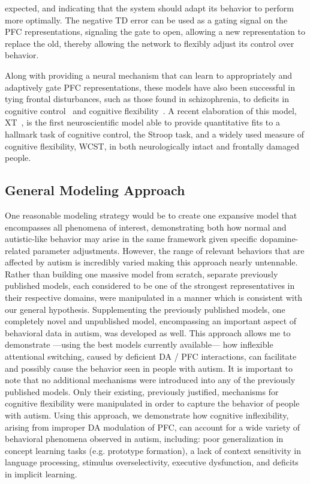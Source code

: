 \documentclass[man]{apa}
\begin{document}
expected, and indicating that the system should adapt its behavior to perform more optimally.  The negative TD error can be used as a gating signal on the PFC representations, signaling the gate to open, allowing a new representation to replace the old, thereby allowing the network to flexibly adjust its control over behavior.

Along with providing a neural mechanism that can learn to appropriately and adaptively gate PFC representations, these models have also been successful in tying frontal disturbances, such as those found in schizophrenia, to deficits in cognitive control~\cite{CohenJD:1992:Schizophrenia} and cognitive flexibility~\cite{BraverTS:1999:Schizophrenia,OReillyRC:2002:IDED}.  A recent elaboration of this model, XT~\cite{RougierNP:2005:XT}, is the first neuroscientific model able to provide quantitative fits to a hallmark task of cognitive control, the Stroop task, and a widely used measure of cognitive flexibility, WCST, in both neurologically intact and frontally damaged people.  

\subsection{General Modeling Approach}
One reasonable modeling strategy would be to create one expansive model that encompasses all phenomena of interest, demonstrating both how normal and autistic-like behavior may arise in the same framework given specific dopamine-related parameter adjustments.  However, the range of relevant behaviors that are affected by autism is incredibly varied making this approach nearly untennable.   Rather than building one massive model from scratch, separate previously published models, each considered to be one of the strongest representatives in their respective domains, were manipulated in a manner which is consistent with our general hypothesis.  Supplementing the previously published models, one completely novel and unpublished model, encompassing an important aspect of behavioral data in autism, was developed as well.  This approach allows me to demonstrate ---using the best models currently available--- how inflexible attentional switching, caused by deficient DA / PFC interactions, can facilitate and possibly cause the behavior seen in people with autism.  It is important to note that no additional mechanisms were introduced into any of the previously published models.  Only their existing, previously justified, mechanisms for cognitive flexibility were manipulated in order to capture the behavior of people with autism.  Using this approach, we demonstrate how cognitive inflexibility, arising from improper DA modulation of PFC, can account for a wide variety of behavioral phenomena observed in autism, including: poor generalization in concept learning tasks (e.g. prototype formation), a lack of context sensitivity in language processing, stimulus overselectivity, executive dysfunction, and deficits in implicit learning. 
\end{document}
